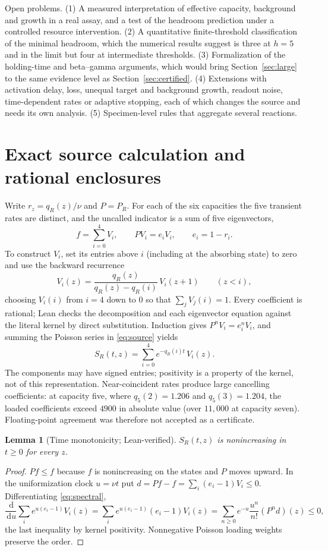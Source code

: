 \documentclass[11pt,a4paper]{article}
\theoremstyle{plain}
\newtheorem{lemma}[theorem]{Lemma}
\theoremstyle{definition}
\theoremstyle{remark}
\newcommand{\dd}{\,\mathrm d}
\begin{document}
Open problems. (1) A measured interpretation of effective capacity, background and growth in a real assay, and a test of the headroom prediction under a controlled resource intervention. (2) A quantitative finite-threshold classification of the minimal headroom, which the numerical results suggest is three at $h=5$ and in the limit but four at intermediate thresholds. (3) Formalization of the holding-time and beta--gamma arguments, which would bring Section~\ref{sec:large} to the same evidence level as Section~\ref{sec:certified}. (4) Extensions with activation delay, loss, unequal target and background growth, readout noise, time-dependent rates or adaptive stopping, each of which changes the source and needs its own analysis. (5) Specimen-level rules that aggregate several reactions.

\appendix

\section{Exact source calculation and rational enclosures}\label{app:exact}
Write $r_z=q_R(z)/\nu$ and $P=P_R$. For each of the six capacities the five transient rates are distinct, and the uncalled indicator is a sum of five eigenvectors,
\[
f=\sum_{i=0}^{4}V_i,\qquad PV_i=e_iV_i,\qquad e_i=1-r_i.
\]
To construct $V_i$, set its entries above $i$ (including at the absorbing state) to zero and use the backward recurrence
\begin{equation}\label{eq:recurrence}
V_i(z)=\frac{q_R(z)}{q_R(z)-q_R(i)}\,V_i(z+1)\qquad(z<i),
\end{equation}
choosing $V_i(i)$ from $i=4$ down to $0$ so that $\sum_jV_j(i)=1$. Every coefficient is rational; Lean checks the decomposition and each eigenvector equation against the literal kernel by direct substitution. Induction gives $P^nV_i=e_i^nV_i$, and summing the Poisson series in \eqref{eq:source} yields
\begin{equation}\label{eq:spectral}
S_R(t,z)=\sum_{i=0}^{4}e^{-q_R(i)t}\,V_i(z).
\end{equation}
The components may have signed entries; positivity is a property of the kernel, not of this representation. Near-coincident rates produce large cancelling coefficients: at capacity five, where $q_5(2)=1.206$ and $q_5(3)=1.204$, the loaded coefficients exceed $4900$ in absolute value (over $11{,}000$ at capacity seven). Floating-point agreement was therefore not accepted as a certificate.

\begin{lemma}[Time monotonicity; Lean-verified]\label{lem:antitone}
$S_R(t,z)$ is nonincreasing in $t\ge0$ for every $z$.
\end{lemma}
\begin{proof}
$Pf\le f$ because $f$ is nonincreasing on the states and $P$ moves upward. In the uniformization clock $u=\nu t$ put $d=Pf-f=\sum_i(e_i-1)V_i\le0$. Differentiating \eqref{eq:spectral},
\[
\frac{\dd}{\dd u}\sum_ie^{u(e_i-1)}V_i(z)=\sum_ie^{u(e_i-1)}(e_i-1)V_i(z)=\sum_{n\ge0}e^{-u}\frac{u^n}{n!}(P^nd)(z)\le0,
\]
the last inequality by kernel positivity. Nonnegative Poisson loading weights preserve the order.
\end{proof}
\end{document}
